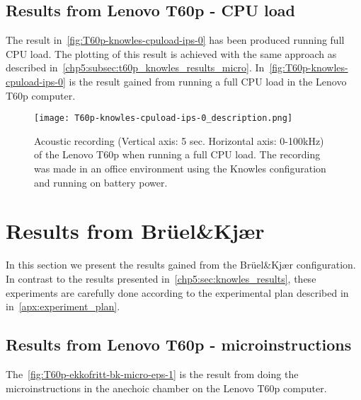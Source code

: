 \subsection{Results from Lenovo T60p - CPU load}\label{chp5:subsec:t60p_knowles_results_cpuload}
The result in~\autoref{fig:T60p-knowles-cpuload-ips-0} has been produced running full CPU load. The plotting of this result is achieved with the same approach as described in~\autoref{chp5:subsec:t60p_knowles_results_micro}. 
In~\autoref{fig:T60p-knowles-cpuload-ips-0} is the result gained from running a full CPU load in the Lenovo T60p computer. 
\begin{figure}[ht]
    \centering
    \texttt{[image: T60p-knowles-cpuload-ips-0\_description.png]}
    \caption{Acoustic recording (Vertical axis: 5 sec. Horizontal axis: 0-100kHz) of the Lenovo T60p when running a full CPU load. The recording was made in an office environment using the Knowles configuration and running on battery power. }
    \label{fig:T60p-knowles-cpuload-ips-0}
\end{figure}

\section{Results from Brüel\&Kjær}\label{chp5:sec:bk_results}
In this section we present the results gained from the Brüel\&Kjær configuration. 
In contrast to the results presented in~\autoref{chp5:sec:knowles_results}, these experiments are carefully done according to the experimental plan described in in~\autoref{apx:experiment_plan}. 

\subsection{Results from Lenovo T60p - microinstructions}\label{chp5:subsec:t60p_bk_results_micro}
The~\autoref{fig:T60p-ekkofritt-bk-micro-eps-1} is the result from doing the microinstructions in the anechoic chamber on the Lenovo T60p computer.


